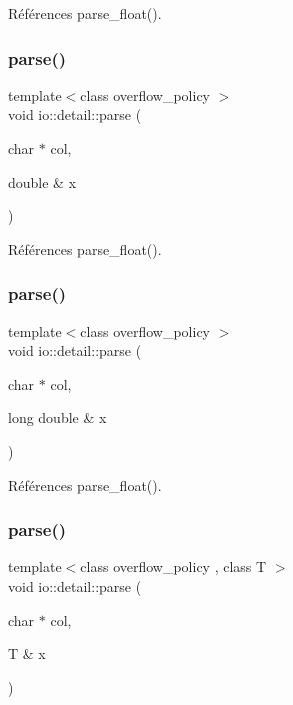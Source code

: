 Références parse\+\_\+float().

\mbox{\label{namespaceio_1_1detail_af795e6a74044788a6b4a3179a7839a9a}} 
\subsubsection{\texorpdfstring{parse()}{parse()}\hspace{0.1cm}{\footnotesize\ttfamily [16/18]}}
{\footnotesize\ttfamily template$<$class overflow\+\_\+policy $>$ \\
void io\+::detail\+::parse (\begin{DoxyParamCaption}\item[{char $\ast$}]{col,  }\item[{double \&}]{x }\end{DoxyParamCaption})}



Références parse\+\_\+float().

\mbox{\label{namespaceio_1_1detail_aa5ded2fa5b85ef50ef2c0c3334f8fe6e}} 
\subsubsection{\texorpdfstring{parse()}{parse()}\hspace{0.1cm}{\footnotesize\ttfamily [17/18]}}
{\footnotesize\ttfamily template$<$class overflow\+\_\+policy $>$ \\
void io\+::detail\+::parse (\begin{DoxyParamCaption}\item[{char $\ast$}]{col,  }\item[{long double \&}]{x }\end{DoxyParamCaption})}



Références parse\+\_\+float().

\mbox{\label{namespaceio_1_1detail_ae54f2ce37fee9f7320e2167cc6157a98}} 
\subsubsection{\texorpdfstring{parse()}{parse()}\hspace{0.1cm}{\footnotesize\ttfamily [18/18]}}
{\footnotesize\ttfamily template$<$class overflow\+\_\+policy , class T $>$ \\
void io\+::detail\+::parse (\begin{DoxyParamCaption}\item[{char $\ast$}]{col,  }\item[{T \&}]{x }\end{DoxyParamCaption})}

